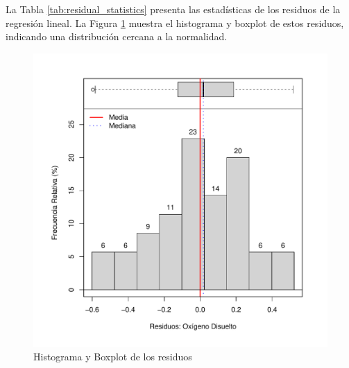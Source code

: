 La Tabla \ref{tab:residual_statistics} presenta las estadísticas de los residuos de la regresión lineal. La Figura \ref{fig:enter-labelod} muestra el histograma y boxplot de estos residuos, indicando una distribución cercana a la normalidad.

\begin{figure}[!htb]
    \centering
    \includegraphics[width=0.5\linewidth]{Figuras_AED/OD_Residual_HistBoxPlot.pdf}
    \caption{Histograma y Boxplot de los residuos}
    \label{fig:enter-labelod}
\end{figure}

